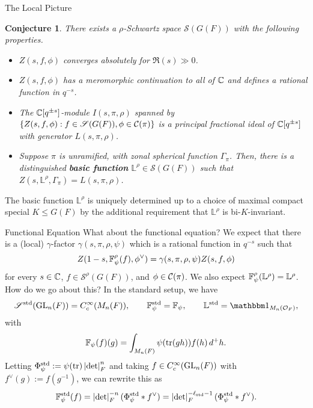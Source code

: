\documentclass[aspectratio=1610]{beamer}
\renewcommand{\L}{\mathbb{L}}
\renewcommand{\S}{\mathscr{S}}
\newcommand{\std}{\textup{std}}
\newtheorem{conjecture}{Conjecture}
\begin{document}

\begin{frame}{The Local Picture}
\pause 
\begin{conjecture}
There exists a $\rho$-Schwartz space $\S(G(F))$ with the following properties.

\begin{itemize}
\pause\item $Z(s,f,\phi)$ converges absolutely for $\Re(s)\gg0$.

\pause\item $Z(s,f,\phi)$ has a meromorphic continuation to all of $\mathbb{C}$ and defines a rational function in $q^{-s}$.

\pause\item The $\mathbb{C}[q^{\pm s}]$-module $I(s,\pi,\rho)$ spanned by $\{Z(s,f,\phi) : f\in\S(G(F)),\phi\in\mc{C}(\pi)\}$ is a principal fractional ideal of $\mathbb{C}[q^{\pm s}]$ with generator $L(s,\pi,\rho)$.

\pause\item Suppose $\pi$ is unramified, with zonal spherical function $\Gamma_{\pi}$. Then, there is a distinguished \textbf{basic function} $\L^{\rho}\in\S(G(F))$ such that $Z(s,\L^{\rho},\Gamma_{\pi})=L(s,\pi,\rho)$.
\end{itemize}
\end{conjecture}

\pause The basic function $\L^{\rho}$ is uniquely determined up to a choice of maximal compact special $K\leq G(F)$ by the additional requirement that $\L^{\rho}$ is bi-$K$-invariant. 
\end{frame}

\begin{frame}{Functional Equation}
\pause What about the functional equation? We expect that there is a (local) $\gamma$-factor $\gamma(s,\pi,\rho,\psi)$ which is a rational function in $q^{-s}$ such that 
$$Z(1-s,\mathbb{F}_{\psi}^{\rho}(f),\phi^{\vee})=\gamma(s,\pi,\rho,\psi)Z(s,f,\phi)$$
for every $s\in\mathbb{C}$, $f\in\S^{\rho}(G(F))$, and $\phi\in\mathcal{C}(\pi)$. \pause We also expect $\F_{\psi}^{\rho}(\L^{\rho})=\L^{\rho}$. \pause How do we go about this? \pause In the standard setup, we have
$$\S^{\std}(\GL_n(F))=C_c^{\infty}(M_n(F)),\qquad \F_{\psi}^{\std}=\F_{\psi},\qquad \L^{\std}=\ind_{M_n(\O_F)},$$
with 
$$\mathbb{F}_{\psi}(f)(g)=\int_{M_n(F)}\psi(\operatorname{tr}(gh))f(h)\,d^+h.$$ 
\pause Letting $\Phi_{\psi}^{\std}:=\psi(\tr)\abs{\det}_F^n$ and taking $f\in C_c^{\infty}(\textup{GL}_n(F))$ with $f^{\vee}(g):=f(g^{-1})$, we can rewrite this as 
$$\F_{\psi}^{\std}(f)=\abs{\det}_F^{-n}(\Phi_{\psi}^{\std}*f^{\vee})=\abs{\det}_F^{-\l_{\std}-1}(\Phi_{\psi}^{\std}*f^{\vee}).$$
\end{frame}
\end{document}
